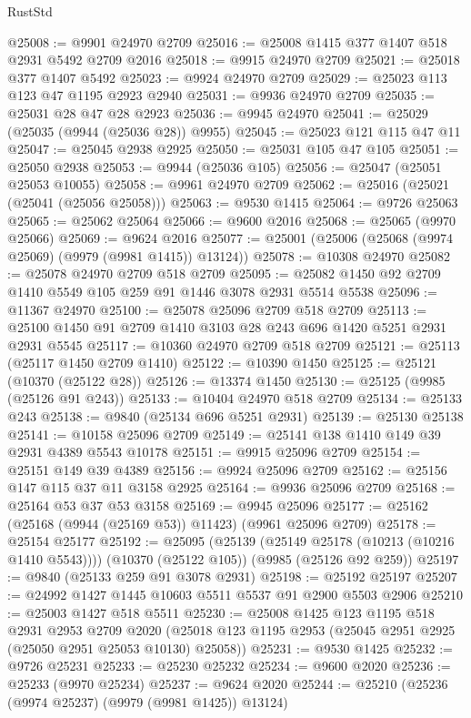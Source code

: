 \begin{lexlean}{RustStd}
\begin{coremodule}
@25008 := @9901 @24970 @2709
@25016 := @25008 @1415 @377 @1407 @518 @2931 @5492 @2709 @2016
@25018 := @9915 @24970 @2709
@25021 := @25018 @377 @1407 @5492
@25023 := @9924 @24970 @2709
@25029 := @25023 @113 @123 @47 @1195 @2923 @2940
@25031 := @9936 @24970 @2709
@25035 := @25031 @28 @47 @28 @2923
@25036 := @9945 @24970
@25041 := @25029 (@25035 (@9944 (@25036 @28)) @9955)
@25045 := @25023 @121 @115 @47 @11
@25047 := @25045 @2938 @2925
@25050 := @25031 @105 @47 @105
@25051 := @25050 @2938
@25053 := @9944 (@25036 @105)
@25056 := @25047 (@25051 @25053 @10055)
@25058 := @9961 @24970 @2709
@25062 := @25016 (@25021 (@25041 (@25056 @25058)))
@25063 := @9530 @1415
@25064 := @9726 @25063
@25065 := @25062 @25064
@25066 := @9600 @2016
@25068 := @25065 (@9970 @25066)
@25069 := @9624 @2016
@25077 := @25001 (@25006 (@25068 (@9974 @25069) (@9979 (@9981 @1415)) @13124))
@25078 := @10308 @24970
@25082 := @25078 @24970 @2709 @518 @2709
@25095 := @25082 @1450 @92 @2709 @1410 @5549 @105 @259 @91 @1446 @3078 @2931 @5514 @5538
@25096 := @11367 @24970
@25100 := @25078 @25096 @2709 @518 @2709
@25113 := @25100 @1450 @91 @2709 @1410 @3103 @28 @243 @696 @1420 @5251 @2931 @2931 @5545
@25117 := @10360 @24970 @2709 @518 @2709
@25121 := @25113 (@25117 @1450 @2709 @1410)
@25122 := @10390 @1450
@25125 := @25121 (@10370 (@25122 @28))
@25126 := @13374 @1450
@25130 := @25125 (@9985 (@25126 @91 @243))
@25133 := @10404 @24970 @518 @2709
@25134 := @25133 @243
@25138 := @9840 (@25134 @696 @5251 @2931)
@25139 := @25130 @25138
@25141 := @10158 @25096 @2709
@25149 := @25141 @138 @1410 @149 @39 @2931 @4389 @5543 @10178
@25151 := @9915 @25096 @2709
@25154 := @25151 @149 @39 @4389
@25156 := @9924 @25096 @2709
@25162 := @25156 @147 @115 @37 @11 @3158 @2925
@25164 := @9936 @25096 @2709
@25168 := @25164 @53 @37 @53 @3158
@25169 := @9945 @25096
@25177 := @25162 (@25168 (@9944 (@25169 @53)) @11423) (@9961 @25096 @2709)
@25178 := @25154 @25177
@25192 := @25095
    (@25139 (@25149 @25178 (@10213 (@10216 @1410 @5543))))
    (@10370 (@25122 @105))
    (@9985 (@25126 @92 @259))
@25197 := @9840 (@25133 @259 @91 @3078 @2931)
@25198 := @25192 @25197
@25207 := @24992 @1427 @1445 @10603 @5511 @5537 @91 @2900 @5503 @2906
@25210 := @25003 @1427 @518 @5511
@25230 := @25008
    @1425
    @123
    @1195
    @518
    @2931
    @2953
    @2709
    @2020
    (@25018 @123 @1195 @2953 (@25045 @2951 @2925 (@25050 @2951 @25053 @10130) @25058))
@25231 := @9530 @1425
@25232 := @9726 @25231
@25233 := @25230 @25232
@25234 := @9600 @2020
@25236 := @25233 (@9970 @25234)
@25237 := @9624 @2020
@25244 := @25210 (@25236 (@9974 @25237) (@9979 (@9981 @1425)) @13124)

\end{coremodule}
\end{lexlean}
